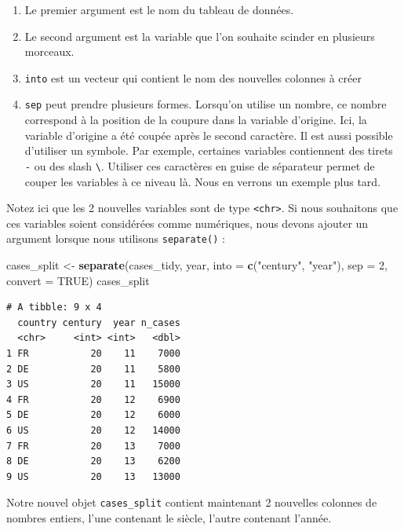 \documentclass[a4paperpaper,]{article}
\newenvironment{Shaded}{\begin{snugshade}}{\end{snugshade}}
\newcommand{\DataTypeTok}[1]{\textcolor[rgb]{0.00,0.34,0.68}{#1}}
\newcommand{\DecValTok}[1]{\textcolor[rgb]{0.69,0.50,0.00}{#1}}
\newcommand{\KeywordTok}[1]{\textcolor[rgb]{0.12,0.11,0.11}{\textbf{#1}}}
\newcommand{\NormalTok}[1]{\textcolor[rgb]{0.12,0.11,0.11}{#1}}
\newcommand{\OtherTok}[1]{\textcolor[rgb]{0.00,0.43,0.16}{#1}}
\newcommand{\StringTok}[1]{\textcolor[rgb]{0.75,0.01,0.01}{#1}}
\providecommand{\tightlist}{%
  \setlength{\itemsep}{0pt}\setlength{\parskip}{0pt}}
\begin{document}
\begin{enumerate}
\def\labelenumi{\arabic{enumi}.}
\tightlist
\item
  Le premier argument est le nom du tableau de données.
\item
  Le second argument est la variable que l'on souhaite scinder en plusieurs morceaux.
\item
  \texttt{into} est un vecteur qui contient le nom des nouvelles colonnes à créer
\item
  \texttt{sep} peut prendre plusieurs formes. Lorsqu'on utilise un nombre, ce nombre correspond à la position de la coupure dans la variable d'origine. Ici, la variable d'origine a été coupée après le second caractère. Il est aussi possible d'utiliser un symbole. Par exemple, certaines variables contiennent des tirets \texttt{-} ou des slash \texttt{\textbackslash{}}. Utiliser ces caractères en guise de séparateur permet de couper les variables à ce niveau là. Nous en verrons un exemple plus tard.
\end{enumerate}

Notez ici que les 2 nouvelles variables sont de type \texttt{\textless{}chr\textgreater{}}. Si nous souhaitons que ces variables soient considérées comme numériques, nous devons ajouter un argument lorsque nous utilisons \texttt{separate()} :

\begin{Shaded}
\begin{Highlighting}[]
\NormalTok{cases_split <-}\StringTok{ }\KeywordTok{separate}\NormalTok{(cases_tidy, year, }\DataTypeTok{into =} \KeywordTok{c}\NormalTok{(}\StringTok{"century"}\NormalTok{, }\StringTok{"year"}\NormalTok{), }
    \DataTypeTok{sep =} \DecValTok{2}\NormalTok{, }\DataTypeTok{convert =} \OtherTok{TRUE}\NormalTok{)}
\NormalTok{cases_split}
\end{Highlighting}
\end{Shaded}

\begin{verbatim}
# A tibble: 9 x 4
  country century  year n_cases
  <chr>     <int> <int>   <dbl>
1 FR           20    11    7000
2 DE           20    11    5800
3 US           20    11   15000
4 FR           20    12    6900
5 DE           20    12    6000
6 US           20    12   14000
7 FR           20    13    7000
8 DE           20    13    6200
9 US           20    13   13000
\end{verbatim}

Notre nouvel objet \texttt{cases\_split} contient maintenant 2 nouvelles colonnes de nombres entiers, l'une contenant le siècle, l'autre contenant l'année.
\end{document}
